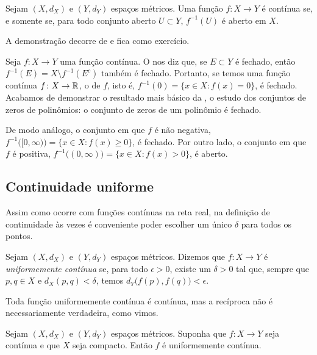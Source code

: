\begin{thm} \label{thm:mstopocont}
Sejam $(X,d_X)$ e $(Y,d_Y)$ espaços métricos. Uma função $f \colon X \to Y$
é contínua se, e somente se,
para todo conjunto aberto $U \subset Y$, $f^{-1}(U)$ é aberto em $X$.
\end{thm}

A demonstração decorre de  e fica
como exercício.

\begin{example}
Seja $f \colon X \to Y$ uma função contínua.
O  nos diz que, se $E \subset Y$ é fechado, então
$f^{-1}(E) = X \setminus f^{-1}(E^c)$ também é fechado. Portanto, se
temos uma função contínua
$f \colon X \to {\mathbb{R}}$, o
\emph{} de $f$, isto é,
$f^{-1}(0) = \bigl\{ x \in X : f(x) = 0 \bigr\}$, é fechado.
Acabamos de demonstrar o resultado mais básico da
\emph{}, o estudo dos conjuntos
de zeros de polinômios: o conjunto de zeros de um polinômio é fechado.

De modo análogo, o conjunto em que $f$ é não negativa,
$f^{-1}\bigl( [0,\infty) \bigr) = \bigl\{ x \in X : f(x) \geq 0 \bigr\}$,
é fechado. Por outro lado, o
conjunto em que $f$ é positiva,
$f^{-1}\bigl( (0,\infty) \bigr) = \bigl\{ x \in X : f(x) > 0 \bigr\}$,
é aberto.
\end{example}

\subsection{Continuidade uniforme}

Assim como ocorre com funções contínuas na reta real, na definição de continuidade
às vezes é conveniente poder escolher
um único $\delta$ para todos os pontos.

\begin{defn}
Sejam $(X,d_X)$ e $(Y,d_Y)$ espaços métricos.
Dizemos que $f \colon X \to Y$ é
\emph{uniformemente contínua}
se, para todo $\epsilon > 0$,
existe um $\delta > 0$ tal que, sempre que $p,q \in X$ e $d_X(p,q) <
\delta$, temos
$d_Y\bigl(f(p),f(q)\bigr) < \epsilon$.
\end{defn}

Toda função uniformemente contínua é contínua, mas a recíproca não
é necessariamente verdadeira, como vimos.

\begin{thm} \label{thm:Xcompactfunifcont}
Sejam $(X,d_X)$ e $(Y,d_Y)$ espaços métricos.
Suponha que $f \colon X \to Y$ seja contínua e que $X$ seja compacto. Então
$f$ é uniformemente contínua.
\end{thm}

